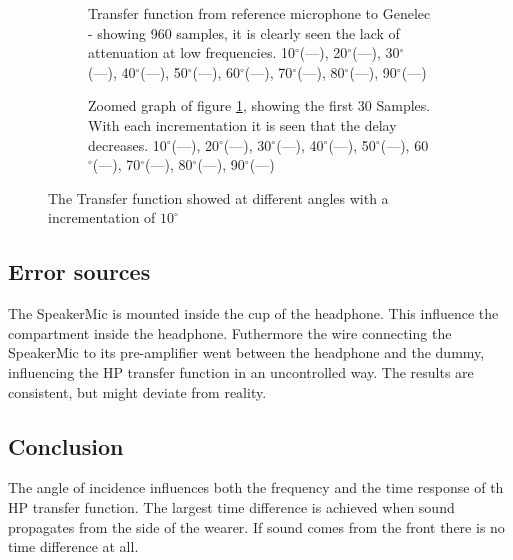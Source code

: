 \begin{figure}[H]
	\centering
	\begin{subfigure}[b]{\textwidth}
	
	\caption{Transfer function from reference microphone to Genelec - showing 960 samples, it is clearly seen the lack of attenuation at low frequencies.
		10$^\circ$(\textcolor{MATLABblue}{---}), 
		20$^\circ$(\textcolor{MATLABorange}{---}), 	
		30$^\circ$(\textcolor{MATLAByellow}{---}), 	
		40$^\circ$(\textcolor{MATLABpurple}{---}), 	
		50$^\circ$(\textcolor{MATLABgreen}{---}), 	
		60$^\circ$(\textcolor{MATLABbabyblue}{---}), 	
		70$^\circ$(\textcolor{MATLABred}{---}), 	
		80$^\circ$(\textcolor{MATLABblue}{---}), 	
		90$^\circ$(\textcolor{MATLABorange}{---})			
		}
	\label{Fig:AngOfIncTime}
	\end{subfigure} 
	\begin{subfigure}[b]{\textwidth}
	
	\caption{Zoomed graph of figure \ref{Fig:AngOfIncTime}, showing the first 30 Samples. With each incrementation it is seen that the delay decreases.
		10$^\circ$(\textcolor{MATLABblue}{---}), 
		20$^\circ$(\textcolor{MATLABorange}{---}), 	
		30$^\circ$(\textcolor{MATLAByellow}{---}), 	
		40$^\circ$(\textcolor{MATLABpurple}{---}), 	
		50$^\circ$(\textcolor{MATLABgreen}{---}), 	
		60$^\circ$(\textcolor{MATLABbabyblue}{---}), 	
		70$^\circ$(\textcolor{MATLABred}{---}), 	
		80$^\circ$(\textcolor{MATLABblue}{---}), 	
		90$^\circ$(\textcolor{MATLABorange}{---})			
		}
	\label{Fig:AngOfIncTimezoom2}
	\end{subfigure}
	\caption{The Transfer function showed at different angles with a incrementation of $10^{\circ}$}
	\label{fig:AngOfIncResult}
\end{figure}

\subsection{Error sources}
The SpeakerMic is mounted inside the cup of the headphone. This influence the compartment inside the headphone. Futhermore the wire connecting the SpeakerMic to its pre-amplifier went between the headphone and the dummy, influencing the HP transfer function in an uncontrolled way. The results are consistent, but might deviate from reality.

\subsection{Conclusion}
The angle of incidence influences both the frequency and the time response of th HP transfer function.  The largest time difference is achieved when sound propagates from the side of the wearer. If sound comes from the front there is no time difference at all. 